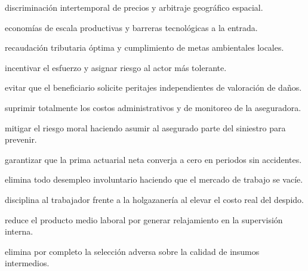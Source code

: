 \begin{opts}
    \item discriminación intertemporal de precios y arbitraje geográfico espacial.
    \item economías de escala productivas y barreras tecnológicas a la entrada.
    \item recaudación tributaria óptima y cumplimiento de metas ambientales locales.
    \item incentivar el esfuerzo y asignar riesgo al actor más tolerante.
\end{opts}

\begin{opts}
    \item evitar que el beneficiario solicite peritajes independientes de valoración de daños.
    \item suprimir totalmente los costos administrativos y de monitoreo de la aseguradora.
    \item mitigar el riesgo moral haciendo asumir al asegurado parte del siniestro para prevenir.
    \item garantizar que la prima actuarial neta converja a cero en periodos sin accidentes.
\end{opts}

\begin{opts}
    \item elimina todo desempleo involuntario haciendo que el mercado de trabajo se vacíe.
    \item disciplina al trabajador frente a la holgazanería al elevar el costo real del despido.
    \item reduce el producto medio laboral por generar relajamiento en la supervisión interna.
    \item elimina por completo la selección adversa sobre la calidad de insumos intermedios.
\end{opts}

